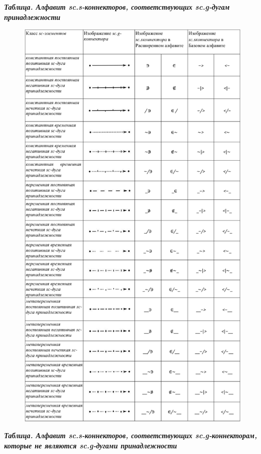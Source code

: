 \textbf{\textit{Таблица. Алфавит sc.s-коннекторов, соответствующих sc.g-дугам принадлежности}}
\begin{figure}[h]
	\centering
	\includegraphics[scale=0.8]{images/intro/scs_membership_connectors.pdf}
\end{figure}


\textbf{\textit{Таблица. Алфавит sc.s-коннекторов, соответствующих sc.g-коннекторам, которые не являются sc.g-дугами принадлежности}}


